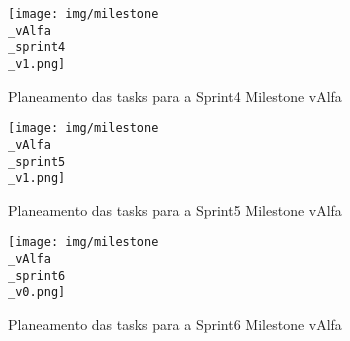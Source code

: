 \begin{figure}[htb]
	\centering
	\texttt{[image: img/milestone\\\_vAlfa\\\_sprint4\\\_v1.png]}  %
	\caption{Planeamento das tasks para a Sprint4 Milestone vAlfa}
	\label{fig:task4004}
\end{figure}


\begin{figure}[htb]
	\centering
	\texttt{[image: img/milestone\\\_vAlfa\\\_sprint5\\\_v1.png]}  %
	\caption{Planeamento das tasks para a Sprint5 Milestone vAlfa}
	\label{fig:task4005}
\end{figure}


\begin{figure}[htb]
	\centering
	\texttt{[image: img/milestone\\\_vAlfa\\\_sprint6\\\_v0.png]}  %
	\caption{Planeamento das tasks para a Sprint6 Milestone vAlfa}
	\label{fig:task4006}
\end{figure}
